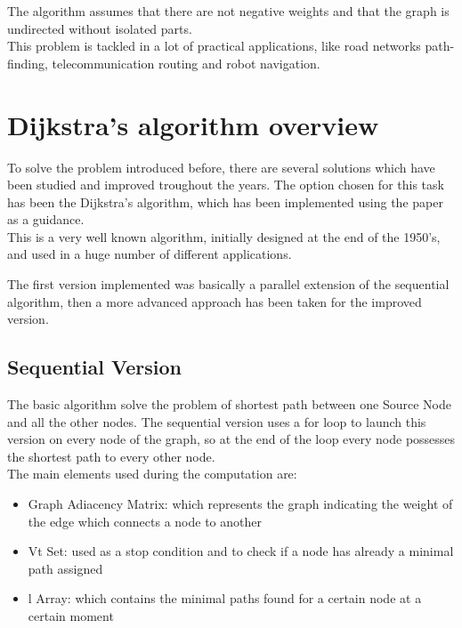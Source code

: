 \documentclass[
	a4paper, %
	12pt, %
]{class}
\begin{document}
The algorithm assumes that there are not negative weights and that the graph is undirected without isolated parts.\\

This problem is tackled in a lot of practical applications, like road networks path-finding, telecommunication routing and robot navigation.

\section{Dijkstra’s algorithm overview}
To solve the problem introduced before, there are several solutions which have been studied and improved troughout the years.
The option chosen for this task has been the Dijkstra’s algorithm, which has been implemented using the paper \cite{paper}
as a guidance.\\

This is a very well known algorithm, initially designed at the end of the 1950's, and used in a huge number of different applications.\cite{dijkstra}

The first version implemented was basically a parallel extension of the sequential algorithm,
then a more advanced approach has been taken for the improved version.

\newpage
\subsection{Sequential Version}
The basic algorithm solve the problem of shortest path between one Source Node and all the other nodes. The sequential version uses a for loop
to launch this version on every node of the graph, so at the end of the loop every node possesses the shortest path to every other node.\\

The main elements used during the computation are:\\
\begin{itemize}
    \item Graph Adiacency Matrix: which represents the graph indicating the weight of the edge which connects a node to another
    \item Vt Set: used as a stop condition and to check if a node has already a minimal path assigned
    \item l Array: which contains the minimal paths found for a certain node at a certain moment\\
\end{itemize}
\end{document}
